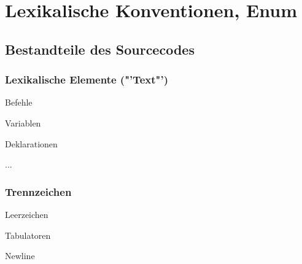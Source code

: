 \section{Lexikalische Konventionen, Enum }
 	\subsection{Bestandteile des Sourcecodes}
 		\begin{minipage}[t]{5.5 cm}
 			\subsubsection{Lexikalische Elemente ("'Text"')}
 				\begin{compactitem}
 					\item Befehle
 					\item Variablen
 					\item Deklarationen
 					\item ... 
 				\end{compactitem}
 		\end{minipage}
 		\hspace*{3.5cm}
 		\begin{minipage}[t]{8 cm}
 			\subsubsection{Trennzeichen}
 				\begin{compactitem}
 					\item Leerzeichen
 					\item Tabulatoren
 					\item Newline
 				\end{compactitem}
 		\end{minipage}
 		
\newpage%
	
